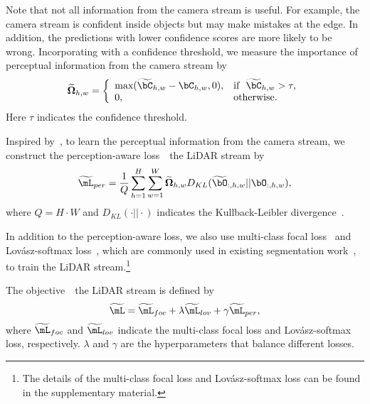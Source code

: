 \documentclass[10pt,twocolumn,letterpaper]{article}
\begin{document}
Note that not all information from the camera stream is useful. For example, the camera stream is confident inside objects but may make mistakes at the edge. In addition, the predictions with lower confidence scores are more likely to be wrong. Incorporating with a confidence threshold, we measure the importance of perceptual information from the camera stream by
\begin{equation}
\label{eq:lidar_weight}
    \widetilde{\mathbf{\Omega}}_{h,w} = \left\{
    \begin{array}{ll}
       \text{max}(\widetilde{\bC}_{h,w} - \bC_{h,w}, 0), & \text{if}~~\widetilde{\bC}_{h,w} >\tau, \\
        0, &  \text{otherwise}. \\
    \end{array}
    \right.
\end{equation}
Here $\tau$ indicates the confidence threshold.

Inspired by~\cite{hinton2015distilling,jaritz2020xmuda,zhang2018deep}, to learn the perceptual information from the camera stream, we construct the perception-aware loss~\wrt~the LiDAR stream by 
\begin{equation}
\label{eq:lidar_percept}
    \widetilde{\mL}_{per} = \frac{1}{Q}\sum_{h=1}^{H}\sum_{w=1}^{W}\widetilde{\mathbf{\Omega}}_{h,w} D_{KL}(\widetilde{\bO}_{:,h,w}|| \bO_{:,h,w}),
\end{equation}
where $Q=H \cdot W$ and $D_{KL}(\cdot||\cdot)$ indicates the Kullback-Leibler divergence~\cite{hinton2015distilling}.













In addition to the perception-aware loss, we also use multi-class focal loss~\cite{lin2017focal} and Lov{\'a}sz-softmax loss~\cite{berman2018lovasz}, which are commonly used in existing segmentation work~\cite{cortinhal2020salsanext,zhu2021cylindrical}, to train the LiDAR stream.\footnote{The details of the multi-class focal loss and Lov{\'a}sz-softmax loss can be found in the supplementary material.} 





The objective~\wrt~the LiDAR stream is defined by
\begin{equation}
\label{eq:lidar_obj}
    \widetilde{\mL} = \widetilde{\mL}_{foc} + \lambda\widetilde{\mL}_{lov} + \gamma\widetilde{\mL}_{per},
\end{equation}
where $\widetilde{\mL}_{foc}$ and $\widetilde{\mL}_{lov}$ indicate the multi-class focal loss and Lov{\'a}sz-softmax loss, respectively.  $\lambda$ and $\gamma$ are the hyperparameters that balance different losses.
\end{document}
